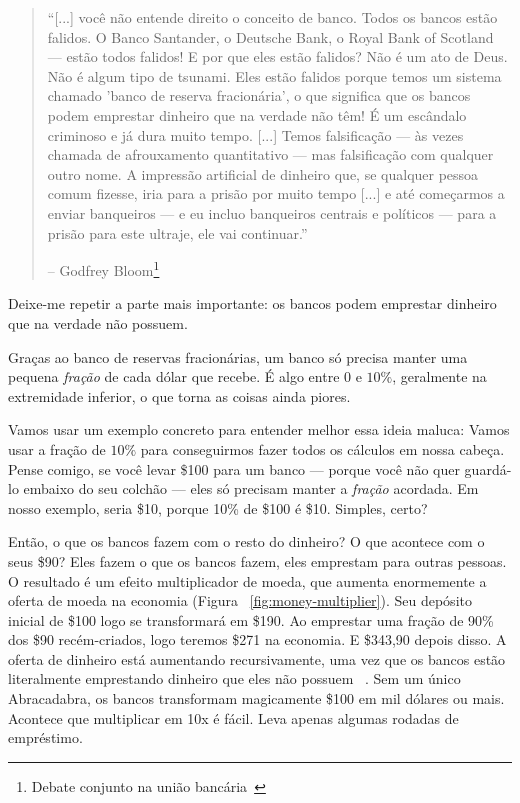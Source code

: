 \begin{quotation}\begin{samepage}
\enquote{[...] você não entende direito o conceito de banco. Todos os bancos estão falidos. O Banco Santander, o Deutsche Bank, o Royal Bank of Scotland --- estão todos falidos! E por que eles estão falidos? Não é um ato de Deus. Não é algum tipo de tsunami. Eles estão falidos porque temos um sistema chamado 'banco de reserva fracionária', o que significa que os bancos podem emprestar dinheiro que na verdade não têm! É um escândalo criminoso e já dura muito tempo. [...] Temos falsificação --- às vezes chamada de afrouxamento quantitativo --- mas falsificação com qualquer outro nome. A impressão artificial de dinheiro que, se qualquer pessoa comum fizesse, iria para a prisão por muito tempo [...] e até começarmos a enviar banqueiros --- e eu incluo banqueiros centrais e políticos --- para a prisão para este ultraje, ele vai continuar.}
\begin{flushright} -- Godfrey Bloom\footnote{Debate conjunto na união bancária~\cite{godfrey-bloom}}
\end{flushright}\end{samepage}\end{quotation}

Deixe-me repetir a parte mais importante: os bancos podem emprestar dinheiro que na verdade não possuem.

Graças ao banco de reservas fracionárias, um banco só precisa manter uma pequena \textit{fração} de cada dólar que recebe. É algo entre $0$ e $10\%$, geralmente na extremidade inferior, o que torna as coisas ainda piores.

Vamos usar um exemplo concreto para entender melhor essa ideia maluca: Vamos usar a fração de $10\%$ para conseguirmos fazer todos os cálculos em nossa cabeça. Pense comigo, se você levar \$100 para um banco --- porque você não quer guardá-lo embaixo do seu colchão --- eles só precisam manter a \textit{fração} acordada. Em nosso exemplo, seria \$10, porque 10\% de \$100 é \$10. Simples, certo?

Então, o que os bancos fazem com o resto do dinheiro? O que acontece com o seus \$90? Eles fazem o que os bancos fazem, eles emprestam para outras pessoas. O resultado é um efeito multiplicador de moeda, que aumenta enormemente a oferta de moeda na economia (Figura ~\ref{fig:money-multiplier}). Seu depósito inicial de \$100 logo se transformará em \$190. Ao emprestar uma fração de 90\% dos \$90 recém-criados, logo teremos \$271 na economia. E \$343,90 depois disso. A oferta de dinheiro está aumentando recursivamente, uma vez que os bancos estão literalmente emprestando dinheiro que eles não possuem ~\cite{wiki:money-multiplier}. Sem um único Abracadabra, os bancos transformam magicamente \$100 em mil dólares ou mais. Acontece que multiplicar em 10x é fácil. Leva apenas algumas rodadas de empréstimo.


